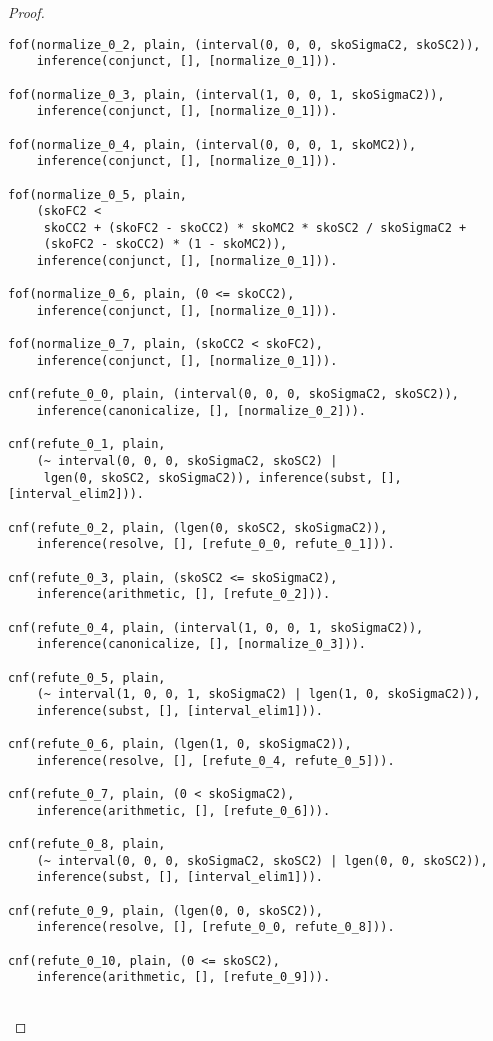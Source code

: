 \begin{proof}
\begin{verbatim}
fof(normalize_0_2, plain, (interval(0, 0, 0, skoSigmaC2, skoSC2)),
    inference(conjunct, [], [normalize_0_1])).

fof(normalize_0_3, plain, (interval(1, 0, 0, 1, skoSigmaC2)),
    inference(conjunct, [], [normalize_0_1])).

fof(normalize_0_4, plain, (interval(0, 0, 0, 1, skoMC2)),
    inference(conjunct, [], [normalize_0_1])).

fof(normalize_0_5, plain,
    (skoFC2 <
     skoCC2 + (skoFC2 - skoCC2) * skoMC2 * skoSC2 / skoSigmaC2 +
     (skoFC2 - skoCC2) * (1 - skoMC2)),
    inference(conjunct, [], [normalize_0_1])).

fof(normalize_0_6, plain, (0 <= skoCC2),
    inference(conjunct, [], [normalize_0_1])).

fof(normalize_0_7, plain, (skoCC2 < skoFC2),
    inference(conjunct, [], [normalize_0_1])).

cnf(refute_0_0, plain, (interval(0, 0, 0, skoSigmaC2, skoSC2)),
    inference(canonicalize, [], [normalize_0_2])).

cnf(refute_0_1, plain,
    (~ interval(0, 0, 0, skoSigmaC2, skoSC2) |
     lgen(0, skoSC2, skoSigmaC2)), inference(subst, [], [interval_elim2])).

cnf(refute_0_2, plain, (lgen(0, skoSC2, skoSigmaC2)),
    inference(resolve, [], [refute_0_0, refute_0_1])).

cnf(refute_0_3, plain, (skoSC2 <= skoSigmaC2),
    inference(arithmetic, [], [refute_0_2])).

cnf(refute_0_4, plain, (interval(1, 0, 0, 1, skoSigmaC2)),
    inference(canonicalize, [], [normalize_0_3])).

cnf(refute_0_5, plain,
    (~ interval(1, 0, 0, 1, skoSigmaC2) | lgen(1, 0, skoSigmaC2)),
    inference(subst, [], [interval_elim1])).

cnf(refute_0_6, plain, (lgen(1, 0, skoSigmaC2)),
    inference(resolve, [], [refute_0_4, refute_0_5])).

cnf(refute_0_7, plain, (0 < skoSigmaC2),
    inference(arithmetic, [], [refute_0_6])).

cnf(refute_0_8, plain,
    (~ interval(0, 0, 0, skoSigmaC2, skoSC2) | lgen(0, 0, skoSC2)),
    inference(subst, [], [interval_elim1])).

cnf(refute_0_9, plain, (lgen(0, 0, skoSC2)),
    inference(resolve, [], [refute_0_0, refute_0_8])).

cnf(refute_0_10, plain, (0 <= skoSC2),
    inference(arithmetic, [], [refute_0_9])).


\end{verbatim}
\end{proof}
